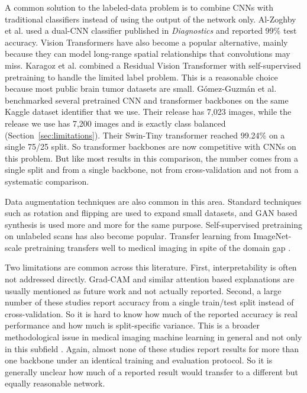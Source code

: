 \documentclass[11pt]{article}
\begin{document}
A common solution to the labeled-data problem is to combine CNNs with traditional classifiers instead of using the output of the network only. Al-Zoghby et al. \cite{alzoghby2023dual} used a dual-CNN classifier published in \emph{Diagnostics} and reported 99\% test accuracy. Vision Transformers \cite{dosovitskiy2021vit} have also become a popular alternative, mainly because they can model long-range spatial relationships that convolutions may miss. Karagoz et al. \cite{karagoz2024resvit} combined a Residual Vision Transformer with self-supervised pretraining to handle the limited label problem. This is a reasonable choice because most public brain tumor datasets are small. G\'omez-Guzm\'an et al. \cite{gomezguzman2025swin} benchmarked several pretrained CNN and transformer backbones on the same Kaggle dataset identifier that we use. Their release has 7,023 images, while the release we use has 7,200 images and is exactly class balanced (Section~\ref{sec:limitations}). Their Swin-Tiny transformer reached 99.24\% on a single 75/25 split. So transformer backbones are now competitive with CNNs on this problem. But like most results in this comparison, the number comes from a single split and from a single backbone, not from cross-validation and not from a systematic comparison.

Data augmentation techniques are also common in this area. Standard techniques such as rotation and flipping are used to expand small datasets, and GAN based synthesis \cite{goodfellow2014gan} is used more and more for the same purpose. Self-supervised pretraining on unlabeled scans has also become popular. Transfer learning from ImageNet-scale pretraining transfers well to medical imaging in spite of the domain gap \cite{morid2021transfer}.

Two limitations are common across this literature. First, interpretability is often not addressed directly. Grad-CAM and similar attention based explanations are usually mentioned as future work and not actually reported. Second, a large number of these studies report accuracy from a single train/test split instead of cross-validation. So it is hard to know how much of the reported accuracy is real performance and how much is split-specific variance. This is a broader methodological issue in medical imaging machine learning in general and not only in this subfield \cite{varoquaux2022leakage}. Again, almost none of these studies report results for more than one backbone under an identical training and evaluation protocol. So it is generally unclear how much of a reported result would transfer to a different but equally reasonable network.
\end{document}

